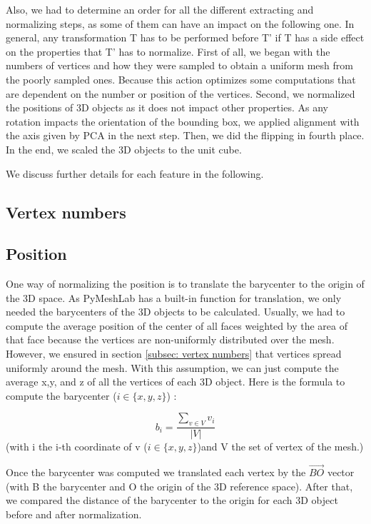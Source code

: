\documentclass[10pt,twocolumn,letterpaper]{article}
\begin{document}
Also, we had to determine an order for all the different extracting and normalizing steps, as some of them can have an impact on the following one. In general, any transformation T has to be performed before T' if T has a side effect on the properties that T'  has to normalize. First of all, we began with the numbers of vertices and how they were sampled to obtain a uniform mesh from the poorly sampled ones. Because this action optimizes some computations that are dependent on the number or position of the vertices. Second, we normalized the positions of 3D objects as it does not impact other properties. As any rotation impacts the orientation of the bounding box, we applied alignment with the axis given by PCA in the next step. Then, we did the flipping in fourth place. In the end, we scaled the 3D objects to the unit cube.

We discuss further details for each feature in the following.


\subsection{Vertex numbers}
\label{subsec:vertex numbers}

\subsection{Position}

One way of normalizing the position is to translate the barycenter to the origin of the 3D space. As PyMeshLab has a built-in function for translation, we only needed the barycenters of the 3D objects to be calculated. Usually, we had to compute the average position of the center of all faces weighted by the area of that face because the vertices are non-uniformly distributed over the mesh. However, we ensured in section \ref{subsec: vertex numbers} that vertices spread uniformly around the mesh. With this assumption, we can just compute the average x,y, and z of all the vertices of each 3D object. Here is the formula to compute the barycenter ($i \in \{x,y,z\}$) :

$$ b_i = \frac{\sum_{v \in V} v_i}{|V|} $$ (with i the i-th coordinate of v ($i \in \{x,y,z\}$)and V the set of vertex of the mesh.)

Once the barycenter was computed we translated each vertex by the $\overrightarrow{BO}$ vector (with B the barycenter and O the origin of the 3D reference space). After that, we compared the distance of the barycenter to the origin for each 3D object before and after normalization.
	
\end{document}
